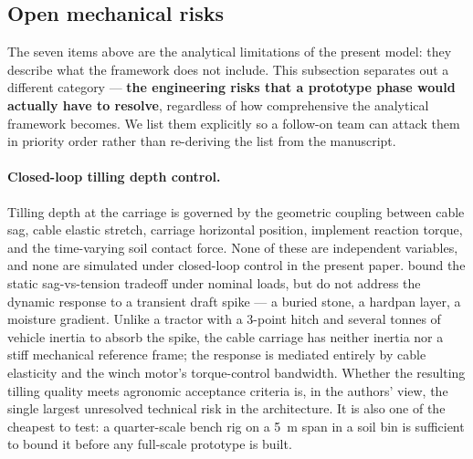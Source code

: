 \documentclass[11pt,a4paper]{article}
\begin{document}
\subsection{Open mechanical risks}\label{sec:open-risks}

The seven items above are the analytical limitations of the present model: they describe what the framework does not include. This subsection separates out a different category --- \textbf{the engineering risks that a prototype phase would actually have to resolve}, regardless of how comprehensive the analytical framework becomes. We list them explicitly so a follow-on team can attack them in priority order rather than re-deriving the list from the manuscript.

\paragraph{Closed-loop tilling depth control.} Tilling depth at the carriage is governed by the geometric coupling between cable sag, cable elastic stretch, carriage horizontal position, implement reaction torque, and the time-varying soil contact force. None of these are independent variables, and none are simulated under closed-loop control in the present paper.  bound the static sag-vs-tension tradeoff under nominal loads, but do not address the dynamic response to a transient draft spike --- a buried stone, a hardpan layer, a moisture gradient. Unlike a tractor with a 3-point hitch and several tonnes of vehicle inertia to absorb the spike, the cable carriage has neither inertia nor a stiff mechanical reference frame; the response is mediated entirely by cable elasticity and the winch motor's torque-control bandwidth. Whether the resulting tilling quality meets agronomic acceptance criteria is, in the authors' view, the single largest unresolved technical risk in the architecture. It is also one of the cheapest to test: a quarter-scale bench rig on a \SI{5}{\meter} span in a soil bin is sufficient to bound it before any full-scale prototype is built.
\end{document}

